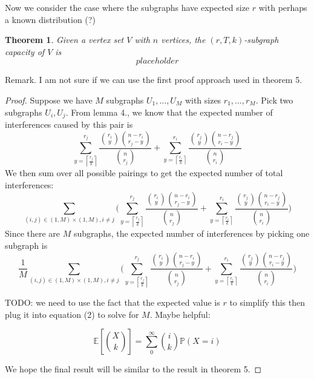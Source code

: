 \documentclass[10pt]{extarticle}
\newcommand{\E}{\mathbb{E}}
\newtheorem{theorem}{Theorem}
\theoremstyle{definition}
\begin{document}
Now we consider the case where the subgraphs have expected size $r$ with perhaps a known distribution (?)

\begin{theorem}
    Given a vertex set $V$ with $n$ vertices, the $(r,T,k)$-subgraph capacity of $V$ is 
    \begin{equation*}
        placeholder
    \end{equation*}
\end{theorem}

Remark. I am not sure if we can use the first proof approach used in theorem 5. 

\begin{proof}
    Suppose we have $M$ subgraphs $U_1,...,U_M$ with sizes $r_1,...,r_M$. Pick two subgraphs $U_i,U_j$. From lemma 4., we know that the expected number of interferences caused by this pair is
    $$
    \sum_{y = \left\lceil \frac{r_j}{k} \right\rceil}^{r_j}  \frac{\binom{r_i}{y} \binom{n-r_i}{r_j-y}}{\binom{n}{r_j}} + \sum_{y = \left\lceil \frac{r_i}{k} \right\rceil}^{r_i}  \frac{\binom{r_j}{y} \binom{n-r_j}{r_i-y}}{\binom{n}{r_i}}
    $$
    We then sum over all possible pairings to get the expected number of total interferences:
    $$
    \sum_{(i,j) \in (1,M)\times(1,M), i \ne j} \Biggl( \sum_{y = \left\lceil \frac{r_j}{k} \right\rceil}^{r_j}  \frac{\binom{r_i}{y} \binom{n-r_i}{r_j-y}}{\binom{n}{r_j}} + \sum_{y = \left\lceil \frac{r_i}{k} \right\rceil}^{r_i}  \frac{\binom{r_j}{y} \binom{n-r_j}{r_i-y}}{\binom{n}{r_i}} \Biggr)
    $$
    Since there are $M$ subgraphs, the expected number of interferences by picking one subgraph is
    $$
    \frac{1}{M} \sum_{(i,j) \in (1,M)\times(1,M), i \ne j} \Biggl( \sum_{y = \left\lceil \frac{r_j}{k} \right\rceil}^{r_j}  \frac{\binom{r_i}{y} \binom{n-r_i}{r_j-y}}{\binom{n}{r_j}} + \sum_{y = \left\lceil \frac{r_i}{k} \right\rceil}^{r_i}  \frac{\binom{r_j}{y} \binom{n-r_j}{r_i-y}}{\binom{n}{r_i}} \Biggr)
    $$


    
    TODO: we need to use the fact that the expected value is $r$ to simplify this then plug it into equation (2) to solve for $M$. Maybe helpful:

    $$
    \E \left[ \binom{X}{k} \right] = \sum_{0}^{\infty} \binom{i}{k} \mathbb{P}(X=i)
    $$
    
    
    We hope the final result will be similar to the result in theorem 5. 

    
\end{proof}
\end{document}
